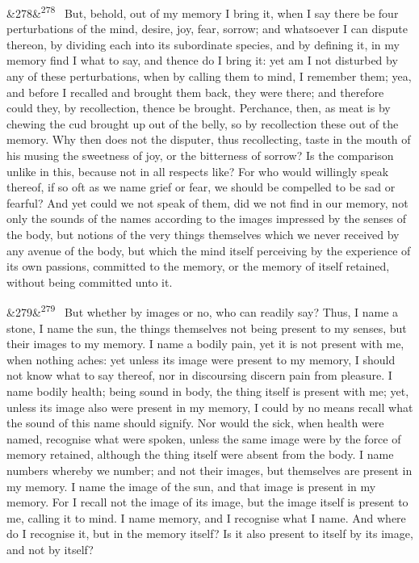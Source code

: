 \documentclass[12pt]{article}
\newcommand{\para}[1][]{\par\noindent\ifx&#1&\else\textsuperscript{\footnotesize #1}~\fi}
\begin{document}
\para[278] But, behold, out of my memory I bring it, when I say there be four perturbations of the mind, desire, joy, fear, sorrow; and whatsoever I can dispute thereon, by dividing each into its subordinate species, and by defining it, in my memory find I what to say, and thence do I bring it: yet am I not disturbed by any of these perturbations, when by calling them to mind, I remember them; yea, and before I recalled and brought them back, they were there; and therefore could they, by recollection, thence be brought. Perchance, then, as meat is by chewing the cud brought up out of the belly, so by recollection these out of the memory. Why then does not the disputer, thus recollecting, taste in the mouth of his musing the sweetness of joy, or the bitterness of sorrow? Is the comparison unlike in this, because not in all respects like? For who would willingly speak thereof, if so oft as we name grief or fear, we should be compelled to be sad or fearful? And yet could we not speak of them, did we not find in our memory, not only the sounds of the names according to the images impressed by the senses of the body, but notions of the very things themselves which we never received by any avenue of the body, but which the mind itself perceiving by the experience of its own passions, committed to the memory, or the memory of itself retained, without being committed unto it.

\para[279] But whether by images or no, who can readily say? Thus, I name a stone, I name the sun, the things themselves not being present to my senses, but their images to my memory. I name a bodily pain, yet it is not present with me, when nothing aches: yet unless its image were present to my memory, I should not know what to say thereof, nor in discoursing discern pain from pleasure. I name bodily health; being sound in body, the thing itself is present with me; yet, unless its image also were present in my memory, I could by no means recall what the sound of this name should signify. Nor would the sick, when health were named, recognise what were spoken, unless the same image were by the force of memory retained, although the thing itself were absent from the body. I name numbers whereby we number; and not their images, but themselves are present in my memory. I name the image of the sun, and that image is present in my memory. For I recall not the image of its image, but the image itself is present to me, calling it to mind. I name memory, and I recognise what I name. And where do I recognise it, but in the memory itself? Is it also present to itself by its image, and not by itself?
\end{document}
